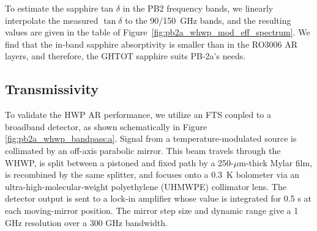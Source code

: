 To estimate the sapphire tan $\delta$ in the PB2 frequency bands, we linearly interpolate the measured $\tan \delta$ to the 90/150~GHz bands, and the resulting values are given in the table of Figure~\ref{fig:pb2a_whwp_mod_eff_spectrum}. We find that the in-band sapphire absorptivity is smaller than in the RO3006 AR layers, and therefore, the GHTOT sapphire suits PB-2a's needs.


\subsection{Transmissivity}
\label{sec:pb2a_whwp_transmissivity}

To validate the HWP AR performance, we utilize an FTS coupled to a broadband detector, as shown schematically in Figure \ref{fig:pb2a_whwp_bandpass:a}. Signal from a temperature-modulated source is collimated by an off-axis parabolic mirror. This beam travels through the WHWP, is split between a pistoned and fixed path by a 250-$\mu$m-thick Mylar film, is recombined by the same splitter, and focuses onto a 0.3~K bolometer via an ultra-high-molecular-weight polyethylene (UHMWPE) collimator lens. The detector output is sent to a lock-in amplifier whose value is integrated for 0.5 s at each moving-mirror position. The mirror step size and dynamic range give a 1 GHz resolution over a 300 GHz bandwidth.

